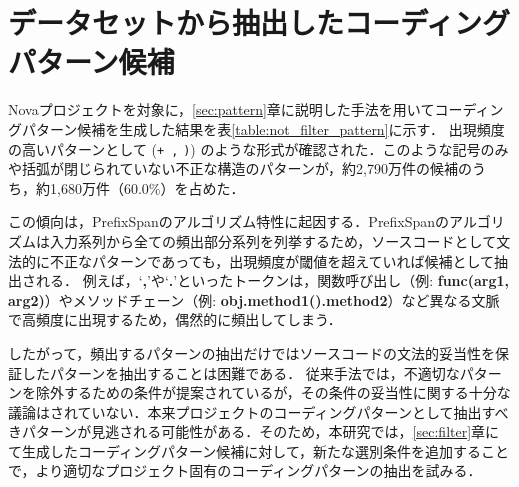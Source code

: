 \documentclass[11pt]{jreport}
\begin{document}
\section{データセットから抽出したコーディングパターン候補}\label{subsec:difficult}
Novaプロジェクトを対象に，\ref{sec:pattern}章に説明した手法を用いてコーディングパターン候補を生成した結果を表\ref{table:not_filter_pattern}に示す．
出現頻度の高いパターンとして (\colorbox{lightgray!50}{\texttt{+ ,}} \colorbox{lightgray!50}{\texttt{)}}) のような形式が確認された．このような記号のみや括弧が閉じられていない不正な構造のパターンが，約2,790万件の候補のうち，約1,680万件（60.0\%）を占めた．

この傾向は，PrefixSpanのアルゴリズム特性に起因する．PrefixSpanのアルゴリズムは入力系列から全ての頻出部分系列を列挙するため，ソースコードとして文法的に不正なパターンであっても，出現頻度が閾値を超えていれば候補として抽出される．
例えば，`\textbf{,}'や`\textbf{.}'といったトークンは，関数呼び出し（例: \textbf{func(arg1, arg2)}）やメソッドチェーン（例: \textbf{obj.method1().method2}）など異なる文脈で高頻度に出現するため，偶然的に頻出してしまう．

したがって，頻出するパターンの抽出だけではソースコードの文法的妥当性を保証したパターンを抽出することは困難である．
従来手法では，不適切なパターンを除外するための条件が提案されているが，その条件の妥当性に関する十分な議論はされていない．本来プロジェクトのコーディングパターンとして抽出すべきパターンが見逃される可能性がある．そのため，本研究では，\ref{sec:filter}章にて生成したコーディングパターン候補に対して，新たな選別条件を追加することで，より適切なプロジェクト固有のコーディングパターンの抽出を試みる．


\end{document}
